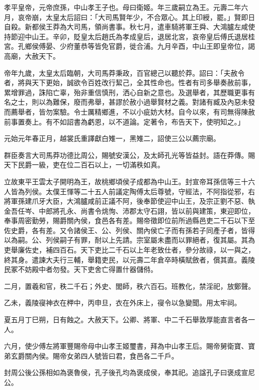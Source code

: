 
\begin{pinyinscope}
孝平皇帝，元帝庶孫，中山孝王子也。母曰衛姬。年三歲嗣立為王。元壽二年六月，哀帝崩，太皇太后詔曰：「大司馬賢年少，不合眾心。其上印綬，罷。」賢即日自殺。新都侯王莽為大司馬，領尚書事。秋七月，遣車騎將軍王舜、大鴻臚左咸使持節迎中山王。辛卯，貶皇太后趙氏為孝成皇后，退居北宮，哀帝皇后傅氏退居桂宮。孔鄉侯傅晏、少府董恭等皆免官爵，徙合浦。九月辛酉，中山王即皇帝位，謁高廟，大赦天下。

帝年九歲，太皇太后臨朝，大司馬莽秉政，百官總己以聽於莽。詔曰：「夫赦令者，將與天下更始，誠欲令百姓改行絜己，全其性命也。性者有司多舉奏赦前事，累增罪過，誅陷亡辜，殆非重信慎刑，洒心自新之意也。及選舉者，其歷職更事有名之士，則以為難保，廢而弗舉，甚謬於赦小過舉賢材之義。對諸有臧及內惡未發而薦舉者，皆勿案驗。令士厲精鄉進，不以小疵妨大材。自今以來，有司無得陳赦前事置奏上。有不如詔書為虧恩，以不道論。定著令，布告天下，使明知之。」

元始元年春正月，越裳氏重譯獻白雉一，黑雉二，詔使三公以薦宗廟。

群臣奏言大司馬莽功德比周公，賜號安漢公，及太師孔光等皆益封。語在莽傳。賜天下民爵一級，吏在位二百石以上，一切滿秩如真。

立故東平王雲太子開明為王，故桃鄉頃侯子成都為中山王。封宣帝耳孫信等三十六人皆為列侯。太僕王惲等二十五人前議定陶傅太后尊號，守經法，不阿指從邪，右將軍孫建爪牙大臣，大鴻臚咸前正議不阿，後奉節使迎中山王，及宗正劉不惡、執金吾任岑、中郎將孔永、尚書令烑恂、沛郡太守石詡，皆以前與建策，東迎即位，奉事周密勤勞，賜爵關內侯，食邑各有差。賜帝徵即位前所過縣邑吏二千石以下至佐史爵，各有差。又令諸侯王、公、列侯、關內侯亡子而有孫若子同產子者，皆得以為嗣。公、列侯嗣子有罪，耐以上先請。宗室屬未盡而以罪絕者，復其屬。其為吏舉廉佐史，補四百石。天下吏比二千石以上年老致仕者，參分故祿，以一與之，終其身。遣諫大夫行三輔，舉籍吏民，以元壽二年倉卒時橫賦斂者，償其直。義陵民冢不妨殿中者勿發。天下吏舍亡得置什器儲偫。

二月，置羲和官，秩二千石；外史、閭師，秩六百石。班教化，禁淫祀，放鄭聲。

乙未，義陵寑神衣在柙中，丙申旦，衣在外床上，寑令以急變聞。用太牢祠。

夏五月丁巳朔，日有蝕之。大赦天下。公卿、將軍、中二千石舉敦厚能直言者各一人。

六月，使少傅左將軍豐賜帝母中山孝王姬璽書，拜為中山孝王后。賜帝舅衛寶、寶弟玄爵關內侯。賜帝女弟四人號皆曰君，食邑各二千戶。

封周公後公孫相如為褒魯侯，孔子後孔均為褒成侯，奉其祀。追諡孔子曰褒成宣尼公。


\end{pinyinscope}
